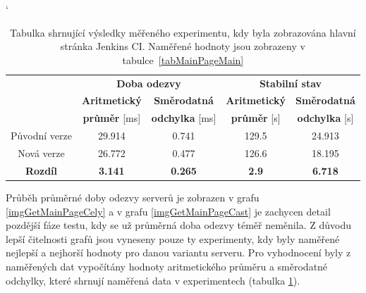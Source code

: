             \begin{table}[h!t]
             \catcode`
             \begin{adjustwidth}{-0.5cm}{}
             \begin{center}
              \begin{tabular}{| c || c | c || c | c |} \hline
                \multirow{3}{*}{}   &    \multicolumn{2}{c||}{\textbf{Doba odezvy}}  &  \multicolumn{2}{c|}{\textbf{Stabilní stav}}\\ \cline{2-5}
                 & \textbf{Aritmetický}  &  \textbf{Směrodatná}  &  \textbf{Aritmetický} &  \textbf{Směrodatná}\\ 
                 & \textbf{průměr} [ms]  &  \textbf{odchylka} [ms]  &  \textbf{průměr} [s]  &  \textbf{odchylka} [s]\\ \hline
                Původní verze & 29.914 &  0.741 &  129.5 &  24.913 \\\hline
                Nová verze & 26.772 &  0.477 &  126.6 &  18.195\\\hline
                \textbf{Rozdíl} &  \textbf{3.141}  &  \textbf{0.265}  &  \textbf{2.9}  &  \textbf{6.718}\\\hline  
              \end{tabular}
              \caption{Tabulka shrnující výsledky měřeného experimentu, kdy byla zobrazována hlavní stránka Jenkins CI. 
                    Naměřené hodnoty jsou zobrazeny v tabulce~\ref{tabMainPageMain}}
              \label{tabMainPageFinal}
             \end{center}
             \end{adjustwidth}
            \end{table}

            Průběh průměrné doby odezvy serverů je zobrazen v grafu \ref{imgGetMainPageCely} a v grafu
            \ref{imgGetMainPageCast} je zachycen detail pozdější fáze testu, kdy se už průměrná doba odezvy téměř neměnila.
            Z důvodu lepší čitelnosti grafů jsou vyneseny pouze ty experimenty, kdy byly naměřené nejlepší a nejhorší hodnoty
            pro danou variantu serveru.
            Pro vyhodnocení byly z naměřených dat vypočítány hodnoty aritmetického průměru a směrodatné odchylky,
            které shrnují naměřená data v experimentech (tabulka \ref{tabMainPageFinal}).

